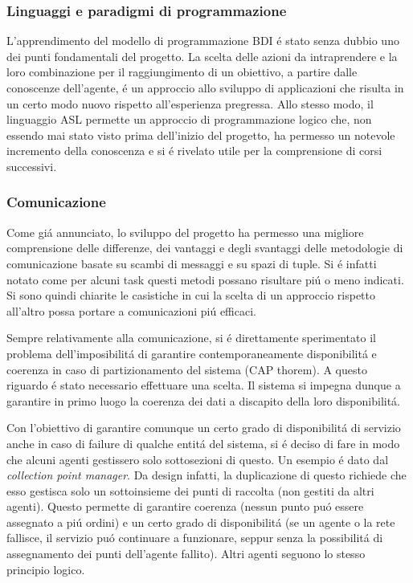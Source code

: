 \subsubsection{Linguaggi e paradigmi di programmazione}
L'apprendimento del modello di programmazione BDI \'e stato senza dubbio uno dei punti fondamentali del progetto. La scelta delle azioni da intraprendere e la loro combinazione per il raggiungimento di un obiettivo, a partire dalle conoscenze dell'agente, \'e un approccio allo sviluppo di applicazioni che risulta in un certo modo nuovo rispetto all'esperienza pregressa. Allo stesso modo, il linguaggio ASL permette un approccio di programmazione logico che, non essendo mai stato visto prima dell'inizio del progetto, ha permesso un notevole incremento della conoscenza e si \'e rivelato utile per la comprensione di corsi successivi.

\subsubsection{Comunicazione}
Come gi\'a annunciato, lo sviluppo del progetto ha permesso una migliore comprensione delle differenze, dei vantaggi e degli svantaggi delle metodologie di comunicazione basate su scambi di messaggi e su spazi di tuple. Si \'e infatti notato come per alcuni task questi metodi possano risultare pi\'u o meno indicati. Si sono quindi chiarite le casistiche in cui la scelta di un approccio rispetto all'altro possa portare a comunicazioni pi\'u efficaci.

\parag
Sempre relativamente alla comunicazione, si \'e direttamente sperimentato il problema dell'imposibilit\'a di garantire contemporaneamente disponibilit\'a e coerenza in caso di partizionamento del sistema (CAP thorem). A questo riguardo \'e stato necessario effettuare una scelta. Il sistema si impegna dunque a garantire in primo luogo la coerenza dei dati a discapito della loro disponibilit\'a.

Con l'obiettivo di garantire comunque un certo grado di disponibilit\'a di servizio anche in caso di failure di qualche entit\'a del sistema, si \'e deciso di fare in modo che alcuni agenti gestissero solo sottosezioni di questo. Un esempio \'e dato dal \textit{collection point manager}. Da design infatti, la duplicazione di questo richiede che esso gestisca solo un sottoinsieme dei punti di raccolta (non gestiti da altri agenti). Questo permette di garantire coerenza (nessun punto pu\'o essere assegnato a pi\'u ordini) e un certo grado di disponibilit\'a (se un agente o la rete fallisce, il servizio pu\'o continuare a funzionare, seppur senza la possibilit\'a di assegnamento dei punti dell'agente fallito). Altri agenti seguono lo stesso principio logico.

